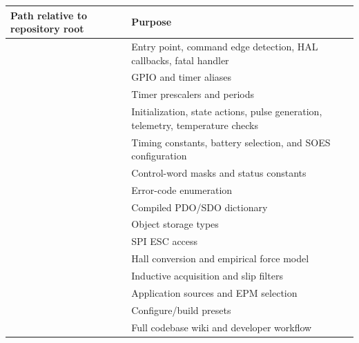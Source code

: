 \documentclass[10pt,a4paper,oneside]{report}
\begin{document}
\begin{longtable}{L{66mm}L{78mm}}
\toprule
Path relative to repository root & Purpose \\
\midrule
\endhead
{} & Entry point, command edge detection, HAL callbacks, fatal handler \\
 & GPIO and timer aliases \\
 & Timer prescalers and periods \\
 & Initialization, state actions, pulse generation, telemetry, temperature checks \\
 & Timing constants, battery selection, and SOES configuration \\
 & Control-word masks and status constants \\
 & Error-code enumeration \\
 & Compiled PDO/SDO dictionary \\
 & Object storage types \\
 & SPI ESC access \\
 & Hall conversion and empirical force model \\
 & Inductive acquisition and slip filters \\
 & Application sources and EPM selection \\
 & Configure/build presets \\
 & Full codebase wiki and developer workflow \\
\bottomrule
\end{longtable}
\end{document}
